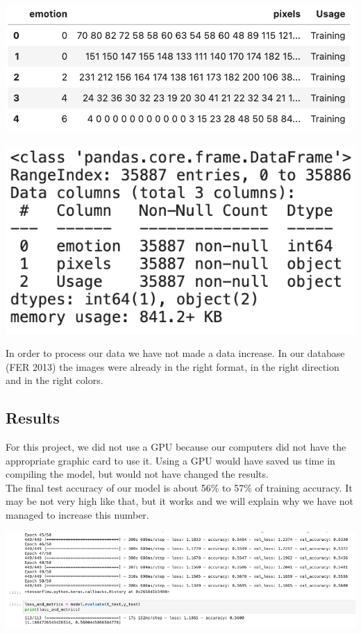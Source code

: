 \documentclass[a4paper, 10pt, conference]{ieeeconf}      %
\begin{document}
\begin{center}
\includegraphics[scale=0.3]{Data}\
\includegraphics[scale=0.3]{Data1}
\label{fig7}
\end{center}

In order to process our data we have not made a data increase. In our database (FER 2013) the images were already in the right format, in the right direction and in the right colors.


\subsection{Results}

For this project, we did not use a GPU because our computers did not have the appropriate graphic card to use it. Using a GPU would have saved us time in compiling the model, but would not have changed the results.\\

The final test accuracy of our model is about 56\% to 57\% of training accuracy.
It may be not very high like that, but it works and we will explain why we have not managed to increase this number.

\begin{center}
\includegraphics[scale=0.55]{Results}
\label{fig8}
\end{center}
\end{document}
